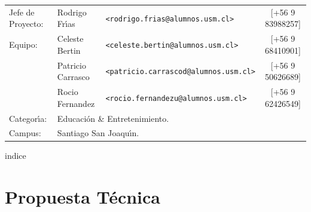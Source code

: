\documentclass[letterpaper,12pt]{report} %
\numberwithin{equation}{section} %
\numberwithin{figure}{section} %
\numberwithin{table}{section} %
\begin{document}
\begin{titlepage}
\vfill
\begin{flushleft} %
\begin{table}[hb]
  \begin{tabular}{lllc}
    Jefe de Proyecto: & Rodrigo Fr\'{\i}as & \texttt{\small <rodrigo.frias@alumnos.usm.cl>} & [+56 9 83988257] \\
    Equipo: & Celeste Bertin & \texttt{\small <celeste.bertin@alumnos.usm.cl>} &[+56 9 68410901]\\
    & Patricio Carrasco &\texttt{\small <patricio.carrascod@alumnos.usm.cl>} &[+56 9 50626689]\\
    & Rocio Fernandez &\texttt{\small <rocio.fernandezu@alumnos.usm.cl>} &[+56 9 62426549]\\
    Categor\'{\i}a: & \multicolumn{3}{l}{Educaci\'on \& Entretenimiento.}\\
    Campus: & \multicolumn{3}{l}{Santiago San Joaqu\'{\i}n.}
  \end{tabular}
\end{table}
\end{flushleft}
\end{titlepage}


\setcounter{page}{1} %

\tableofcontents indice
\newpage

\chapter*{Propuesta T\'ecnica}
\newpage
\end{document}
